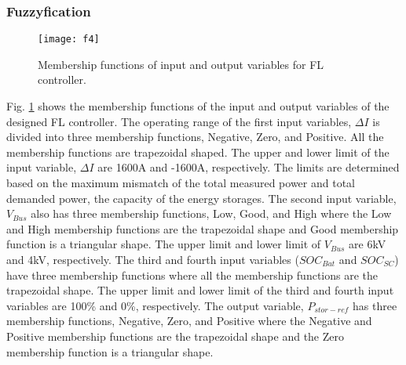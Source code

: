 \subsubsection{Fuzzyfication}
\begin{figure}[ht!]
\centering
\texttt{[image: f4]}
\caption{Membership functions of input and output variables for FL controller.}
\label{sec3_f4}
\end{figure}
Fig. \ref{sec3_f4} shows the membership functions of the input and output variables of the designed FL controller. The operating range of the first input variables, $\Delta I$ is divided into three membership functions, Negative, Zero, and Positive. All the membership functions are trapezoidal shaped. The upper and lower limit of the input variable, $\Delta I$ are 1600A and -1600A, respectively. The limits are determined based on the maximum mismatch of the total measured power and total demanded power, the capacity of the energy storages. The second input variable, $V_{Bus}$ also has three membership functions, Low, Good, and High where the Low and High membership functions are the trapezoidal shape and Good membership function is a triangular shape. The upper limit and lower limit of $V_{Bus}$ are  6kV and 4kV, respectively. The third and fourth input variables ($SOC_{Bat}$ and $SOC_{SC}$) have three membership functions where all the membership functions are the trapezoidal shape. The upper limit and lower limit of the third and fourth input variables are 100\% and 0\%, respectively. The output variable, $P_{stor-ref}$ has three membership functions, Negative, Zero, and Positive where the Negative and Positive membership functions are the trapezoidal shape and the Zero membership function is a triangular shape.
